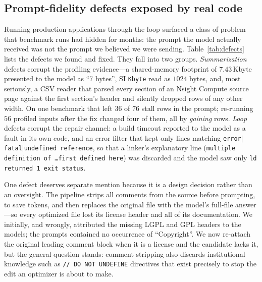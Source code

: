 \subsection{Prompt-fidelity defects exposed by real code}
\label{sec:defects}
Running production applications through the loop surfaced a class of problem that benchmark runs had
hidden for months: the prompt the model actually received was not the prompt we believed we were
sending. Table~\ref{tab:defects} lists the defects we found and fixed. They fall into two groups.
\emph{Summarization} defects corrupt the profiling evidence---a shared-memory footprint of
$7.43$\,Kbyte presented to the model as ``7 bytes'', SI \texttt{Kbyte} read as $1024$ bytes, and, most
seriously, a CSV reader that parsed every section of an Nsight Compute source page against the first
section's header and silently dropped rows of any other width. On one benchmark that left $36$ of $76$
stall rows in the prompt; re-running $56$ profiled inputs after the fix changed four of them, all by
\emph{gaining} rows. \emph{Loop} defects corrupt the repair channel: a build timeout reported to the
model as a fault in its own code, and an error filter that kept only lines matching
\texttt{error}$|$\texttt{fatal}$|$\texttt{undefined reference}, so that a linker's explanatory line
(\texttt{multiple definition of \ldots first defined here}) was discarded and the model saw only
\texttt{ld returned 1 exit status}.

One defect deserves separate mention because it is a design decision rather than an oversight. The
pipeline strips all comments from the source before prompting, to save tokens, and then replaces the
original file with the model's full-file answer---so every optimized file lost its license header and
all of its documentation. We initially, and wrongly, attributed the missing LGPL and GPL headers to the
models; the prompts contained no occurrence of ``Copyright''. We now re-attach the original leading
comment block when it is a license and the candidate lacks it, but the general question stands: comment
stripping also discards institutional knowledge such as \texttt{// DO NOT UNDEFINE} directives that
exist precisely to stop the edit an optimizer is about to make.

